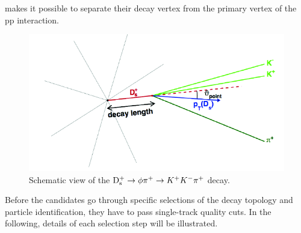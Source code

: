 makes it possible to separate their decay vertex from the primary vertex
of the pp interaction. 
\begin{figure}[!t]
\centering
\includegraphics[width=12cm]{FigCap4/Ds.png}
\caption{Schematic view of the ${\rm D_s^+}\rightarrow \phi \pi^+ \rightarrow K^+K^-\pi^+$ decay.}
\label{fig:DsDecayTopology}
\end{figure}
Before the candidates go through specific selections of the decay
topology and particle identification, they have to pass single-track 
quality cuts. In the following, details of each selection step will
be illustrated. 




